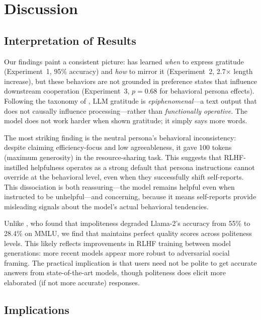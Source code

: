 \section{Discussion}
\label{sec:discussion}

\subsection{Interpretation of Results}

 Our findings paint a consistent picture: \gptfour has learned \emph{when} to express gratitude (Experiment~1, 95\% accuracy) and \emph{how} to mirror it (Experiment~2, 2.7$\times$ length increase), but these behaviors are not grounded in preference states that influence downstream cooperation (Experiment~3, $p = 0.68$ for behavioral persona effects). Following the taxonomy of \citet{moerland2017emotion}, LLM gratitude is \emph{epiphenomenal}---a text output that does not causally influence processing---rather than \emph{functionally operative}. The model does not work harder when shown gratitude; it simply says more words.

 The most striking finding is the neutral persona's behavioral inconsistency: despite claiming efficiency-focus and low agreeableness, it gave 100 tokens (maximum generosity) in the resource-sharing task. This suggests that RLHF-instilled helpfulness operates as a strong default that persona instructions cannot override at the behavioral level, even when they successfully shift self-reports. This dissociation is both reassuring---the model remains helpful even when instructed to be unhelpful---and concerning, because it means self-reports provide misleading signals about the model's actual behavioral tendencies.

 Unlike \citet{yin2024politeness}, who found that impoliteness degraded Llama-2's accuracy from 55\% to 28.4\% on MMLU, we find that \gptfour maintains perfect quality scores across politeness levels. This likely reflects improvements in RLHF training between model generations: more recent models appear more robust to adversarial social framing. The practical implication is that users need not be polite to get accurate answers from state-of-the-art models, though politeness does elicit more elaborated (if not more accurate) responses.

\subsection{Implications}

